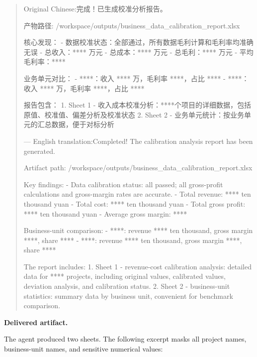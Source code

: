 \documentclass[11pt, a4paper, copyright, frontis]{frontis}
\newcommand{\caseheader}[1]{\noindent\colorbox{fbcaseblue}{\parbox{0.96\linewidth}{\color{white}\bfseries #1}}\vspace{0.5mm}\newline}
\newenvironment{casebox}{%
  \begin{quote}%
  \setlength{\parindent}{0pt}%
  \setlength{\parskip}{0pt}%
}{%
  \end{quote}%
}
\newenvironment{caselines}{%
  \begingroup
  \parindent0pt
  \parskip0pt
  \obeylines
  \obeyspaces
}{%
  \endgroup
}
\begin{document}
\begin{casebox}\scriptsize\raggedright
\begin{caselines}
Original Chinese:\nopagebreak[4]
完成！已生成校准分析报告。

产物路径: /workspace/outputs/business\_data\_calibration\_report.xlsx

核心发现：
- 数据校准状态：全部通过，所有数据毛利计算和毛利率均准确无误
- 总收入：**** 万元
- 总成本：**** 万元
- 总毛利：**** 万元
- 平均毛利率：****

业务单元对比：
- ****：收入 **** 万，毛利率 ****，占比 ****
- ****：收入 **** 万，毛利率 ****，占比 ****

报告包含：
1. Sheet 1 - 收入成本校准分析：****个项目的详细数据，包括原值、校准值、偏差分析及校准状态
2. Sheet 2 - 业务单元统计：按业务单元的汇总数据，便于对标分析

---
English translation:\nopagebreak[4]
Completed! The calibration analysis report has been generated.

Artifact path: /workspace/outputs/business\_data\_calibration\_report.xlsx

Key findings:
- Data calibration status: all passed; all gross-profit calculations and gross-margin rates are accurate.
- Total revenue: **** ten thousand yuan
- Total cost: **** ten thousand yuan
- Total gross profit: **** ten thousand yuan
- Average gross margin: ****

Business-unit comparison:
- ****: revenue **** ten thousand, gross margin ****, share ****
- ****: revenue **** ten thousand, gross margin ****, share ****

The report includes:
1. Sheet 1 - revenue-cost calibration analysis: detailed data for **** projects, including original values, calibrated values, deviation analysis, and calibration status.
2. Sheet 2 - business-unit statistics: summary data by business unit, convenient for benchmark comparison.
\end{caselines}
\end{casebox}

\caseheader{Delivered artifact.}
The agent produced two sheets. The following excerpt masks all project names, business-unit names, and sensitive numerical values:
\end{document}
